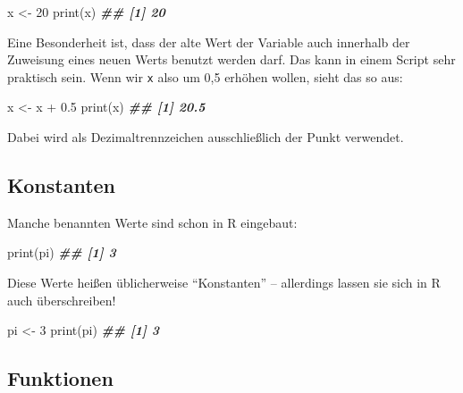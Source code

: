 \documentclass[
  ngerman,
]{article}
\newenvironment{Shaded}{\begin{snugshade}}{\end{snugshade}}
\newcommand{\DecValTok}[1]{\textcolor[rgb]{0.00,0.00,0.81}{#1}}
\newcommand{\DocumentationTok}[1]{\textcolor[rgb]{0.56,0.35,0.01}{\textbf{\textit{#1}}}}
\newcommand{\FloatTok}[1]{\textcolor[rgb]{0.00,0.00,0.81}{#1}}
\newcommand{\FunctionTok}[1]{\textcolor[rgb]{0.00,0.00,0.00}{#1}}
\newcommand{\NormalTok}[1]{#1}
\newcommand{\OtherTok}[1]{\textcolor[rgb]{0.56,0.35,0.01}{#1}}
\newcommand{\SpecialCharTok}[1]{\textcolor[rgb]{0.00,0.00,0.00}{#1}}
\begin{document}
\begin{Shaded}
\begin{Highlighting}[]
\NormalTok{x }\OtherTok{\textless{}{-}} \DecValTok{20}
\FunctionTok{print}\NormalTok{(x)}
\DocumentationTok{\#\# [1] 20}
\end{Highlighting}
\end{Shaded}

Eine Besonderheit ist, dass der alte Wert der Variable auch innerhalb der Zuweisung eines neuen Werts benutzt werden darf. Das kann in einem Script sehr praktisch sein. Wenn wir \texttt{x} also um 0,5 erhöhen wollen, sieht das so aus:

\begin{Shaded}
\begin{Highlighting}[]
\NormalTok{x }\OtherTok{\textless{}{-}}\NormalTok{ x }\SpecialCharTok{+} \FloatTok{0.5}
\FunctionTok{print}\NormalTok{(x)}
\DocumentationTok{\#\# [1] 20.5}
\end{Highlighting}
\end{Shaded}

Dabei wird als Dezimaltrennzeichen ausschließlich der Punkt verwendet.

\hypertarget{konstanten}{%
\subsection{Konstanten}\label{konstanten}}

Manche benannten Werte sind schon in R eingebaut:

\begin{Shaded}
\begin{Highlighting}[]
\FunctionTok{print}\NormalTok{(pi)}
\DocumentationTok{\#\# [1] 3}
\end{Highlighting}
\end{Shaded}

Diese Werte heißen üblicherweise ``Konstanten'' -- allerdings lassen sie sich in R auch überschreiben!

\begin{Shaded}
\begin{Highlighting}[]
\NormalTok{pi }\OtherTok{\textless{}{-}} \DecValTok{3}
\FunctionTok{print}\NormalTok{(pi)}
\DocumentationTok{\#\# [1] 3}
\end{Highlighting}
\end{Shaded}

\hypertarget{funktionen}{%
\subsection{Funktionen}\label{funktionen}}
\end{document}
